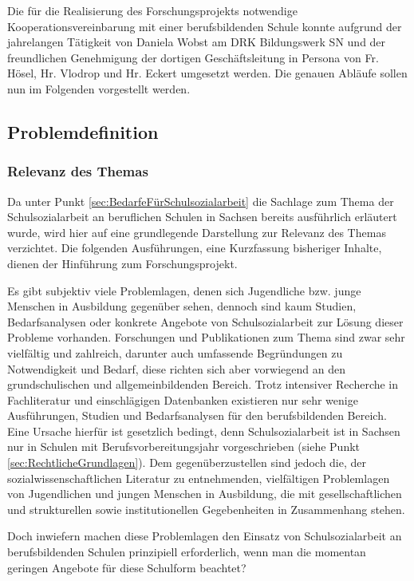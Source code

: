 Die für die Realisierung des Forschungsprojekts notwendige Kooperationsvereinbarung mit einer berufsbildenden Schule konnte aufgrund der jahrelangen Tätigkeit von Daniela Wobst am DRK Bildungswerk SN und der freundlichen Genehmigung der dortigen Geschäftsleitung in Persona von Fr. Hösel, Hr. Vlodrop und Hr. Eckert umgesetzt werden. Die genauen Abläufe sollen nun im Folgenden vorgestellt werden.

\subsection{Problemdefinition}
\label{sec:Problemdefinition}

\subsubsection{Relevanz des Themas}
\label{sec:RelevanzDesThemas}

Da unter Punkt \ref{sec:BedarfeFürSchulsozialarbeit} die Sachlage zum Thema der Schulsozialarbeit an beruflichen Schulen in Sachsen bereits ausführlich erläutert wurde, wird hier auf eine grundlegende Darstellung zur Relevanz des Themas verzichtet. Die folgenden Ausführungen, eine Kurzfassung bisheriger Inhalte, dienen der Hinführung zum Forschungsprojekt.

Es gibt subjektiv viele Problemlagen, denen sich Jugendliche bzw. junge Menschen in Ausbildung gegenüber sehen, dennoch sind kaum Studien, Bedarfsanalysen oder konkrete Angebote von Schulsozialarbeit zur Lösung dieser Probleme vorhanden. Forschungen und Publikationen zum Thema sind zwar sehr vielfältig und zahlreich, darunter auch umfassende Begründungen zu Notwendigkeit und Bedarf, diese richten sich aber vorwiegend an den grundschulischen und allgemeinbildenden Bereich. Trotz intensiver Recherche in Fachliteratur und einschlägigen Datenbanken existieren nur sehr wenige Ausführungen, Studien und Bedarfsanalysen für den berufsbildenden Bereich. Eine Ursache hierfür ist gesetzlich bedingt, denn Schulsozialarbeit ist in Sachsen nur in Schulen mit Berufsvorbereitungsjahr vorgeschrieben (siehe Punkt \ref{sec:RechtlicheGrundlagen}). Dem gegenüberzustellen sind jedoch die, der sozialwissenschaftlichen Literatur zu entnehmenden, vielfältigen Problemlagen von Jugendlichen und jungen Menschen in Ausbildung, die mit gesellschaftlichen und strukturellen sowie institutionellen Gegebenheiten in Zusammenhang stehen. 

Doch inwiefern machen diese Problemlagen den Einsatz von Schulsozialarbeit an berufsbildenden Schulen prinzipiell erforderlich, wenn man die momentan geringen Angebote für diese Schulform beachtet? 

